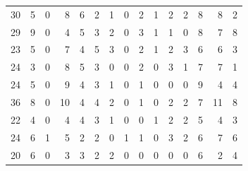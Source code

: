 \begin{table}[]
\begin{tabular}{rrrrrrrrrrrrrrr}
		30 & 5 & 0 & 8 & 6 & 2 & 1 & 0 & 2 & 1 & 2 & 2 & 8 & 8 & 2 \\
		29 & 9 & 0 & 4 & 5 & 3 & 2 & 0 & 3 & 1 & 1 & 0 & 8 & 7 & 8 \\
		23 & 5 & 0 & 7 & 4 & 5 & 3 & 0 & 2 & 1 & 2 & 3 & 6 & 6 & 3 \\
		24 & 3 & 0 & 8 & 5 & 3 & 0 & 0 & 2 & 0 & 3 & 1 & 7 & 7 & 1 \\
		24 & 5 & 0 & 9 & 4 & 3 & 1 & 0 & 1 & 0 & 0 & 0 & 9 & 4 & 4 \\
		36 & 8 & 0 & 10 & 4 & 4 & 2 & 0 & 1 & 0 & 2 & 2 & 7 & 11 & 8 \\
		22 & 4 & 0 & 4 & 4 & 3 & 1 & 0 & 0 & 1 & 2 & 2 & 5 & 4 & 3 \\
		24 & 6 & 1 & 5 & 2 & 2 & 0 & 1 & 1 & 0 & 3 & 2 & 6 & 7 & 6 \\
		20 & 6 & 0 & 3 & 3 & 2 & 2 & 0 & 0 & 0 & 0 & 0 & 6 & 2 & 4
	\end{tabular}
\end{table}

